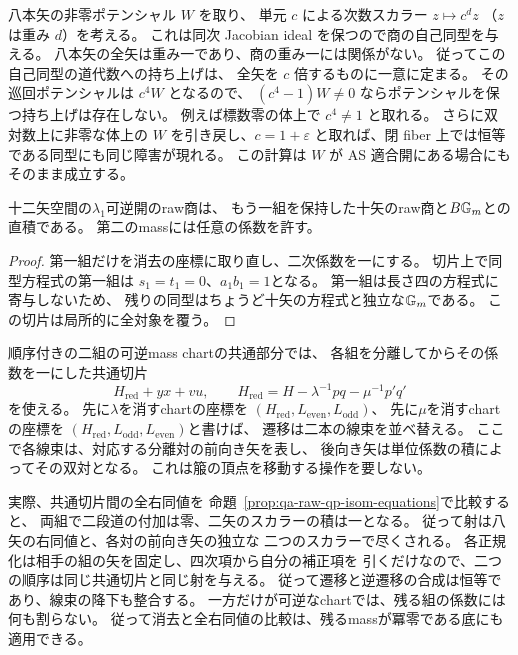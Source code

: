 \begin{example}[次数スカラーの持ち上げ障害]
八本矢の非零ポテンシャル $W$ を取り、
単元 $c$ による次数スカラー $z\mapsto c^d z$
（$z$ は重み $d$）を考える。
これは同次 Jacobian ideal を保つので商の自己同型を与える。
八本矢の全矢は重み一であり、商の重み一には関係がない。
従ってこの自己同型の道代数への持ち上げは、
全矢を $c$ 倍するものに一意に定まる。
その巡回ポテンシャルは $c^4 W$ となるので、
$(c^4-1)W\ne0$ ならポテンシャルを保つ持ち上げは存在しない。
例えば標数零の体上で $c^4\ne1$ と取れる。
さらに双対数上に非零な体上の $W$ を引き戻し、$c=1+\varepsilon$
と取れば、閉 fiber 上では恒等である同型にも同じ障害が現れる。
この計算は $W$ が AS 適合開にある場合にもそのまま成立する。
\end{example}

\begin{corollary}[可逆な一組のみの消去]
\label{cor:qa-qp-single-mass-elimination}
十二矢空間の$\lambda_1$可逆開のraw商は、
もう一組を保持した十矢のraw商と$B\mathbb G_m$との直積である。
第二のmassには任意の係数を許す。
\end{corollary}
\begin{proof}
第一組だけを消去の座標に取り直し、二次係数を一にする。
切片上で同型方程式の第一組は
$s_1=t_1=0$、$a_1b_1=1$となる。
第一組は長さ四の方程式に寄与しないため、
残りの同型はちょうど十矢の方程式と独立な$\mathbb G_m$である。
この切片は局所的に全対象を覆う。
\end{proof}

\begin{remark}
\label{rem:qa-mass-chart-transition}
順序付きの二組の可逆mass chartの共通部分では、
各組を分離してからその係数を一にした共通切片
\[
 H_{\mathrm{red}}+yx+vu,\qquad
 H_{\mathrm{red}}=H-\lambda^{-1}pq-\mu^{-1}p'q'
\]
を使える。
先に$\lambda$を消すchartの座標を
$(H_{\mathrm{red}},L_{\mathrm{even}},L_{\mathrm{odd}})$、
先に$\mu$を消すchartの座標を
$(H_{\mathrm{red}},L_{\mathrm{odd}},L_{\mathrm{even}})$と書けば、
遷移は二本の線束を並べ替える。
ここで各線束は、対応する分離対の前向き矢を表し、
後向き矢は単位係数の積によってその双対となる。
これは箙の頂点を移動する操作を要しない。

実際、共通切片間の全右同値を
命題~\ref{prop:qa-raw-qp-isom-equations}で比較すると、
両組で二段道の付加は零、二矢のスカラーの積は一となる。
従って射は八矢の右同値と、各対の前向き矢の独立な
二つのスカラーで尽くされる。
各正規化は相手の組の矢を固定し、四次項から自分の補正項を
引くだけなので、二つの順序は同じ共通切片と同じ射を与える。
従って遷移と逆遷移の合成は恒等であり、線束の降下も整合する。
一方だけが可逆なchartでは、残る組の係数には何も割らない。
従って消去と全右同値の比較は、残るmassが冪零である底にも適用できる。
\end{remark}

